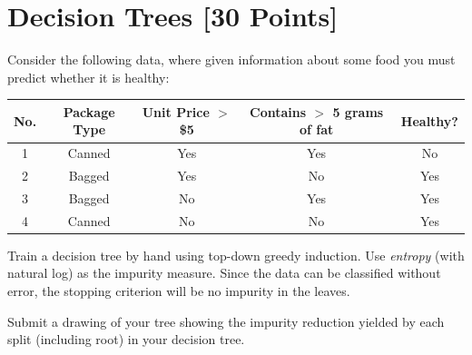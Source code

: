 

\newpage
\section{Decision Trees [30 Points]}

\problem[7]
Consider the following data, where given information about some food you must predict whether it is healthy:

\begin{table}[ht]
\centering
\begin{tabular}{c | c c c | c}
\hline
No. & Package Type & Unit Price $>$ \$5 & Contains $>$ 5 grams of fat & Healthy? \\ [0.5ex]
\hline
1 & Canned & Yes & Yes & No  \\
2 & Bagged & Yes & No  & Yes \\
3 & Bagged & No  & Yes & Yes \\
4 & Canned & No  & No  & Yes \\ [1ex]
\hline
\end{tabular}
\end{table}

Train a decision tree by hand using top-down greedy induction. Use \emph{entropy} (with natural log) as the impurity measure.  Since the data can be classified
without error, the stopping criterion will be no impurity in the leaves.

Submit a drawing of your tree showing the impurity reduction yielded by each split (including root) in your decision tree.

